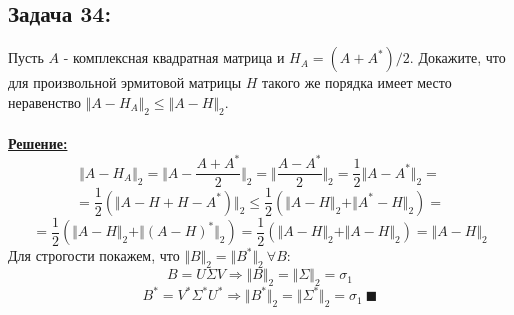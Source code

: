 \documentclass[a4paper,12pt,titlepage,final]{article}
\begin{document}
\subsection*{Задача 34:}
\noindent Пусть $A$ - комплексная квадратная матрица и $H_A = (A + A^*) / 2$. Докажите, что для произвольной эрмитовой матрицы $H$
такого же порядка имеет место неравенство $\Vert A - H_A \Vert_2 \leq \Vert A - H \Vert_2$.\\ \\
\textbf{\underline{Решение:}} \\
$$ \Vert A - H_A \Vert_2 = \Vert A - \frac{A + A^*}{2} \Vert_2 = \Vert \frac{A - A^*}{2} \Vert_2 = \frac{1}{2} \Vert A - A^* \Vert_2 = $$
$$ = \frac{1}{2} (\Vert A - H + H - A^*) \Vert_2 \leq \frac{1}{2}(\Vert A - H \Vert_2 + \Vert A^* - H\Vert_2) = $$
$$ = \frac{1}{2}(\Vert A - H \Vert_2 + \Vert (A - H)^* \Vert_2) = \frac{1}{2}(\Vert A - H \Vert_2 + \Vert A - H \Vert_2) = \Vert A - H \Vert_2$$
Для строгости покажем, что $\Vert B \Vert_2 = \Vert B^* \Vert_2 \: \forall B$:
$$B = U\Sigma V \Rightarrow \Vert B \Vert_2 = \Vert \Sigma\Vert_2 = \sigma_1$$
$$B^* = V^*\Sigma^* U^* \Rightarrow \Vert B^* \Vert_2 = \Vert \Sigma^*\Vert_2 = \sigma_1 \: \blacksquare$$\\

\end{document}
